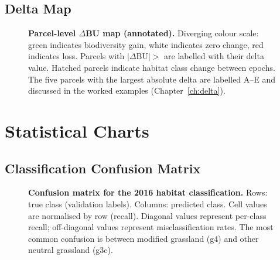 \subsection{Delta Map}

\begin{figure}[H]
\centering
{}
\caption[Annotated parcel-level delta map.]{%
\textbf{Parcel-level $\Delta$BU map (annotated).} Diverging colour scale: green indicates biodiversity gain, white indicates zero change, red indicates loss. Parcels with $|\Delta\text{BU}| > $  are labelled with their delta value. Hatched parcels indicate habitat class change between epochs. The five parcels with the largest absolute delta are labelled A--E and discussed in the worked examples (Chapter~\ref{ch:delta}).%
}
\label{fig:cat-delta-annotated}
\end{figure}


\section{Statistical Charts}

\subsection{Classification Confusion Matrix}

\begin{figure}[H]
\centering
{}
\caption[Classification confusion matrix (2016 epoch).]{%
\textbf{Confusion matrix for the 2016 habitat classification.} Rows: true class (validation labels). Columns: predicted class. Cell values are normalised by row (recall). Diagonal values represent per-class recall; off-diagonal values represent misclassification rates. The most common confusion is between modified grassland (g4) and other neutral grassland (g3c).%
}
\label{fig:cat-confusion-2016}
\end{figure}

